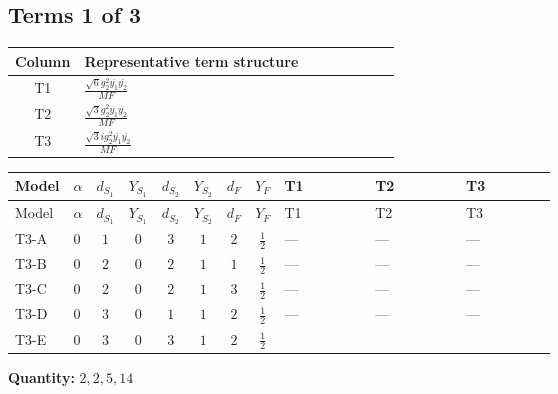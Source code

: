 \documentclass[8pt]{article}
\begin{document}
\begin{landscape}
\subsection*{Terms 1 of 3}
\begin{center}
\begin{tabular}{@{}c >{\raggedright\arraybackslash}p{0.82\linewidth}@{}}
\toprule
Column & Representative term structure \\
\midrule
T1 & \(\displaystyle \frac{\sqrt{6} g_{2}^{2} \overline{y_{1}} \overline{y_{2}}}{MF}\) \\
\midrule
T2 & \(\displaystyle \frac{\sqrt{3} g_{2}^{2} \overline{y_{1}} \overline{y_{2}}}{MF}\) \\
\midrule
T3 & \(\displaystyle \frac{\sqrt{3} i g_{2}^{2} \overline{y_{1}} \overline{y_{2}}}{MF}\) \\
\midrule
\bottomrule
\end{tabular}
\end{center}
\smallskip
\tiny
\begin{longtable}{@{}llcccccc >{\raggedright\arraybackslash}p{0.21\linewidth} >{\raggedright\arraybackslash}p{0.21\linewidth} >{\raggedright\arraybackslash}p{0.21\linewidth}@{}}
\toprule
Model & $\alpha$ & $d_{S_1}$ & $Y_{S_1}$ & $d_{S_2}$ & $Y_{S_2}$ & $d_F$ & $Y_F$ & T1 & T2 & T3 \\
\midrule
\endfirsthead
\toprule
Model & $\alpha$ & $d_{S_1}$ & $Y_{S_1}$ & $d_{S_2}$ & $Y_{S_2}$ & $d_F$ & $Y_F$ & T1 & T2 & T3 \\
\midrule
\endhead
T3-A & $0$ & $1$ & $0$ & $3$ & $1$ & $2$ & $\frac{1}{2}$ & --- & --- & --- \\
\midrule
T3-B & $0$ & $2$ & $0$ & $2$ & $1$ & $1$ & $\frac{1}{2}$ & --- & --- & --- \\
\midrule
T3-C & $0$ & $2$ & $0$ & $2$ & $1$ & $3$ & $\frac{1}{2}$ & --- & --- & --- \\
\midrule
T3-D & $0$ & $3$ & $0$ & $1$ & $1$ & $2$ & $\frac{1}{2}$ & --- & --- & --- \\
\midrule
T3-E & $0$ & $3$ & $0$ & $3$ & $1$ & $2$ & $\frac{1}{2}$ & \scriptsize\adjustbox{max width=\linewidth}{$\begin{gathered} - \frac{\sqrt{6} g_{2}^{2} \overline{y_{1}} \overline{y_{2}}}{3 MF}\end{gathered}$} & \scriptsize\adjustbox{max width=\linewidth}{$\begin{gathered} - \frac{\sqrt{3} g_{2}^{2} \overline{y_{1}} \overline{y_{2}}}{6 MF}\end{gathered}$} & \scriptsize\adjustbox{max width=\linewidth}{$\begin{gathered} - \frac{49 \sqrt{3} i g_{2}^{2} \overline{y_{1}} \overline{y_{2}}}{24 MF}\end{gathered}$} \\
\midrule
\bottomrule
\end{longtable}
\clearpage
\noindent\textbf{Quantity: }$\mathrm{2,2,5,14}$\par\smallskip

\end{landscape}
\end{document}
